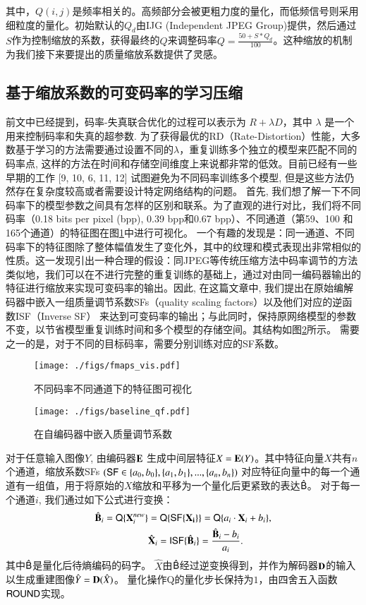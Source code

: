 \documentclass[macfonts,phd,oneside,nobackinfo]{njuthesis}
\begin{document}
其中，$Q(i,j)$是频率相关的。高频部分会被更粗力度的量化，而低频信号则采用细粒度的量化。初始默认的$Q_d$由IJG (Independent JPEG Group)提供，然后通过$S$作为控制缩放的系数，获得最终的$Q$来调整码率$Q = \frac{50+S*Q_d}{100}$。这种缩放的机制为我们接下来要提出的质量缩放系数提供了灵感。

\subsection{基于缩放系数的可变码率的学习压缩}
前文中已经提到，码率-失真联合优化的过程可以表示为 $R + \lambda D$，其中 $\lambda$ 是一个用来控制码率和失真的超参数. 为了获得最优的RD（Rate-Distortion）性能，大多数基于学习的方法需要通过设置不同的$\lambda$，重复训练多个独立的模型来匹配不同的码率点, 这样的方法在时间和存储空间维度上来说都非常的低效。目前已经有一些早期的工作 [9, 10, 6, 11, 12] 试图避免为不同码率训练多个模型, 但是这些方法仍然存在复杂度较高或者需要设计特定网络结构的问题。
首先, 我们想了解一下不同码率下的模型参数之间具有怎样的区别和联系。为了直观的进行对比，我们将不同码率（0.18 bits per pixel (bpp), 0.39 bpp和0.67 bpp）、不同通道（第59、100 和165个通道）的特征图在图\ref{fig:visualize}中进行可视化。 一个有趣的发现是：同一通道、不同码率下的特征图除了整体幅值发生了变化外，其中的纹理和模式表现出非常相似的性质。这一发现引出一种合理的假设：同JPEG等传统压缩方法中码率调节的方法类似地，我们可以在不进行完整的重复训练的基础上，通过对由同一编码器输出的特征进行缩放来实现可变码率的输出。因此, 在这篇文章中, 我们提出在原始编解码器中嵌入一组质量调节系数SFs（quality scaling factors）以及他们对应的逆函数ISF（Inverse SF） 来达到可变码率的输出；与此同时，保持原网络模型的参数不变，以节省模型重复训练时间和多个模型的存储空间。其结构如图\ref{fig:qf}所示。
需要之一的是，对于不同的目标码率，需要分别训练对应的SF系数。
\begin{figure}[t]
   \centering
   \texttt{[image: ./figs/fmaps\_vis.pdf]}  
   \caption{不同码率不同通道下的特征图可视化}
   \label{fig:visualize}
\end{figure}

\begin{figure}[htbp]
\centering
\texttt{[image: ./figs/baseline\_qf.pdf]}
\caption{在自编码器中嵌入质量调节系数}
\label{fig:qf}
\end{figure}

对于任意输入图像$Y$, 由编码器$\bf E$ 生成中间层特征$X = {\bf E}(Y)$。其中特征向量$X$共有$n$个通道，缩放系数SFs $({\sf SF} \in \{a_0,b_0\},\{a_1,b_1\},...,\{a_n,b_n\})$ 对应特征向量中的每一个通道有一组值，用于将原始的$X$缩放和平移为一个量化后更紧致的表达$\hat{\sf B}$。
对于每一个通道$i$, 我们通过如下公式进行变换：
\begin{align}
  \hat{\bf B}_i  = {\sf Q}\{ {\bf X}^{new}_i\} & = {\sf Q}\{ {\sf SF}\{{\bf X_i}\}\} = {\sf Q}\{ a_i\cdot{\bf X}_i + b_i\}, \label{eq:sf}\\
  & \hat{\bf X}_i = {\sf ISF}\{\hat{\bf B}_i\} = \frac{\hat{\bf B}_i - b_i}{a_i}.
\end{align}
其中$\hat{\sf B}$是量化后待熵编码的码字。 $\hat X$由$\hat {\sf B}$经过逆变换得到，并作为解码器$\bf D$的输入以生成重建图像$\hat{Y}={\bf D}({\hat X})$。
量化操作{\sf Q}的量化步长保持为$1$，由四舍五入函数$\sf ROUND$实现。
\end{document}
